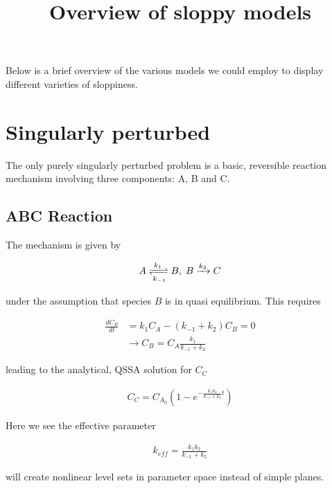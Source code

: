 \documentclass[11pt]{article}
\title{Overview of sloppy models}
\begin{document}
\maketitle

Below is a brief overview of the various models we could employ to display different varieties of sloppiness.

\section{Singularly perturbed}

The only purely singularly perturbed problem is a basic, reversible reaction mechanism involving three components: A, B and C.

\subsection{ABC Reaction}

The mechanism is given by

\begin{align*}
  A \xrightleftharpoons[k_{-1}]{k_1} B, \; B \xrightarrow[]{k_2} C
\end{align*}

under the assumption that species $B$ is in quasi equilibrium. This requires

\begin{align*}
  \frac{dC_B}{dt} &= k_1 C_A - (k_{-1} + k_2) C_B = 0 \\
  &\rightarrow C_B = C_A \frac{k_1}{k_{-1} + k_2}
\end{align*}

leading to the analytical, QSSA solution for $C_C$

\begin{align*}
  C_C = C_{A_0}(1 - e^{-\frac{k_1 k_2}{k_{-1} + k_2} t})
\end{align*}

Here we see the effective parameter

\begin{align*}
  k_{eff} = \frac{k_1 k_2}{k_{-1} + k_2}
\end{align*}

will create nonlinear level sets in parameter space instead of simple planes.


\end{document}
